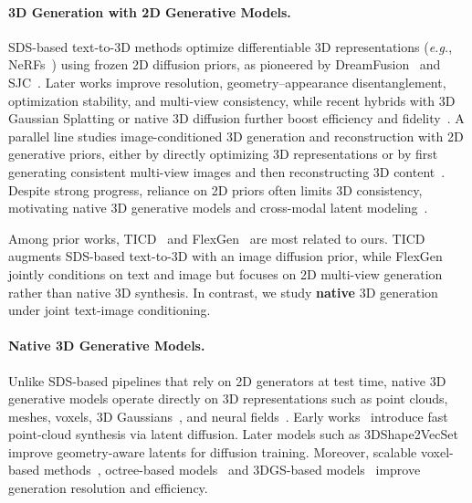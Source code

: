 \paragraph{3D Generation with 2D Generative Models.}
SDS-based text-to-3D methods optimize differentiable 3D representations (\emph{e.g.}, NeRFs~\cite{nerf}) using frozen 2D diffusion priors, as pioneered by DreamFusion~\cite{dreamfusion} and SJC~\cite{sjc}. Later works improve resolution, geometry--appearance disentanglement, optimization stability, and multi-view consistency, while recent hybrids with 3D Gaussian Splatting or native 3D diffusion further boost efficiency and fidelity~\cite{consistent3d,magic3d,fantasia3d,prolificdreamer,li2024connecting,kwak2024geometry,dreamcraft3d,gaussiandreamer,dreamgaussian,liang2024luciddreamer,li2023instant3d}. A parallel line studies image-conditioned 3D generation and reconstruction with 2D generative priors, either by directly optimizing 3D representations or by first generating consistent multi-view images and then reconstructing 3D content~\cite{realfusion,neurallift360,makeit3d,liu2023zero,weng2023consistent123,liu2024one,liu2023one,wonder3d,syncdreamer,xu2024instantmesh,li2023instant3d}. Despite strong progress, reliance on 2D priors often limits 3D consistency, motivating native 3D generative models and cross-modal latent modeling~\cite{michelangelo}.

Among prior works, TICD~\cite{ticd} and FlexGen~\cite{flexgen} are most related to ours. TICD augments SDS-based text-to-3D with an image diffusion prior, while FlexGen jointly conditions on text and image but focuses on 2D multi-view generation rather than native 3D synthesis. In contrast, we study \textbf{native} 3D generation under joint text-image conditioning.

\paragraph{Native 3D Generative Models.}
Unlike SDS-based pipelines that rely on 2D generators at test time, native 3D generative models operate directly on 3D representations such as point clouds, meshes, voxels, 3D Gaussians~\cite{3dgs,tang2024lgm}, and neural fields~\cite{rf, nerf, mipnerf, lan2024ln3diff}. Early works~\cite{nichol2022point, vahdat2022lion} introduce fast point-cloud synthesis via latent diffusion. Later models such as 3DShape2VecSet~\cite{zhang20233dshape2vecset} improve geometry-aware latents for diffusion training. Moreover, scalable voxel-based methods~\cite{ren2024xcube}, octree-based models~\cite{xiong2025octfusion} and 3DGS-based models~\cite{yang2024atlas} improve generation resolution and efficiency. 

